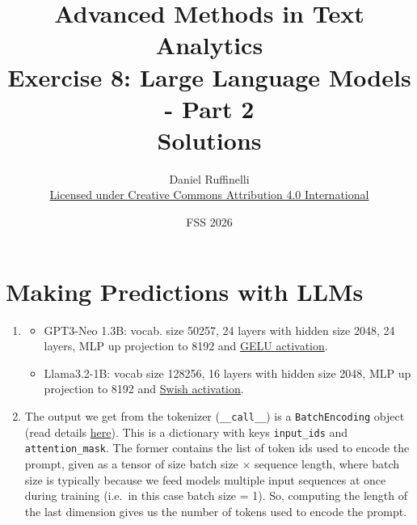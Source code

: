 \documentclass[11pt,a4paper]{article}
\title{Advanced Methods in Text Analytics \\ 
Exercise 8: Large Language Models - Part 2\\
\textbf{Solutions}}
\author{Daniel Ruffinelli \\ \href{https://creativecommons.org/licenses/by/4.0/}{Licensed under Creative Commons Attribution 4.0 International}}
\date{FSS 2026}
\begin{document}
\maketitle

\section{Making Predictions with LLMs}

\begin{enumerate}[label=(\alph*)]
    \item
          \begin{itemize}
              \item GPT3-Neo 1.3B: vocab. size 50257, 24 layers with hidden size
                    2048, 24 layers, MLP up projection to 8192 and
                    \href{https://docs.pytorch.org/docs/stable/generated/torch.nn.GELU.html#torch.nn.GELU}{GELU activation}.
              \item Llama3.2-1B: vocab size 128256, 16 layers with hidden size
                    2048, MLP up projection to 8192 and
                    \href{https://docs.pytorch.org/docs/stable/generated/torch.nn.SiLU.html}{Swish activation}.
          \end{itemize}
    \item The output we get from the tokenizer (\texttt{\_\_call\_\_}) is a
          \texttt{BatchEncoding} object (read details
          \href{https://huggingface.co/docs/transformers/v4.51.3/en/internal/tokenization_utils#transformers.PreTrainedTokenizerBase.__call__}{here}).
          This is a dictionary with keys \texttt{input\_ids} and
          \texttt{attention\_mask}.
          The former contains the list of token ids used to encode the prompt,
          given as a tensor of size batch size $\times$ sequence length, where
          batch size is typically because we feed models multiple input
          sequences at once during training (i.e.\ in this case batch size = 1).
          So, computing the length of the last dimension gives us the number of
          tokens used to encode the prompt.


\end{enumerate}
\end{document}
